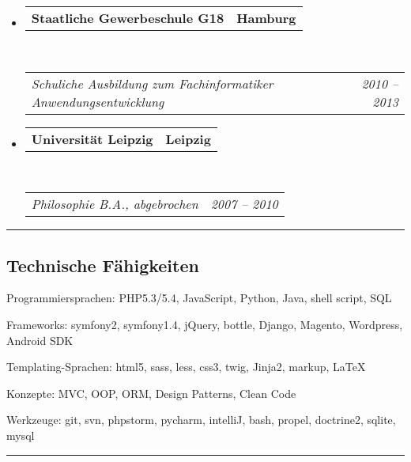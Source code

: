 \documentclass[10pt,letterpaper]{article}
\makeatletter
\newenvironment{indentsection}[1]%
{\begin{list}{}%
	{\setlength{\leftmargin}{#1}}%
	\item[]%
}
{\end{list}}
\newcommand{\headerrow}[2]
{\begin{tabular*}{\linewidth}{l@{\extracolsep{\fill}}r}
	#1 &
	#2 \\
\end{tabular*}}
\makeatother
\begin{document}
\begin{itemize}
	\parskip=0.1em
	
	\item 
	\headerrow
	{\textbf{Staatliche Gewerbeschule G18}}
	{\textbf{Hamburg}}
	\\
	\headerrow
	{\emph{Schuliche Ausbildung zum Fachinformatiker Anwendungsentwicklung}}
	{\emph{2010 -- 2013}}
		
		
	\item 
	\headerrow
	{\textbf{Universität Leipzig}}
	{\textbf{Leipzig}}
	\\
	\headerrow
	{\emph{Philosophie B.A., abgebrochen}}
	{\emph{2007 -- 2010}}
\end{itemize}

\hrule
\vspace{-0.4em}
\subsection*{Technische Fähigkeiten}

\begin{indentsection}{\parindent}
	\begin{description*}
		\item[Programmiersprachen:]
		PHP5.3/5.4, JavaScript, Python, Java, shell script, SQL
		\item[Frameworks:]
		symfony2, symfony1.4, jQuery, bottle, Django, Magento, Wordpress, Android SDK
		\item[Templating-Sprachen:]
		html5, sass, less, css3, twig, Jinja2, markup, \LaTeX
		\item[Konzepte:]
		MVC, OOP, ORM, Design Patterns, Clean Code
		\item[Werkzeuge:]
		git, svn, phpstorm, pycharm, intelliJ, bash, propel, doctrine2, sqlite, mysql
	\end{description*}
\end{indentsection}



\hrule
\vspace{-0.4em}
\end{document}
